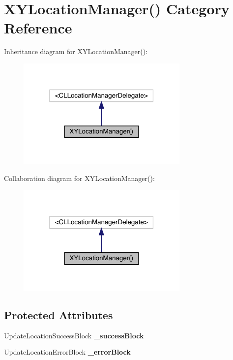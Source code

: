 \hypertarget{category_x_y_location_manager_07_08}{}\section{X\+Y\+Location\+Manager() Category Reference}
\label{category_x_y_location_manager_07_08}


Inheritance diagram for X\+Y\+Location\+Manager()\+:\nopagebreak
\begin{figure}[H]
\begin{center}
\leavevmode
\includegraphics[width=238pt]{category_x_y_location_manager_07_08__inherit__graph}
\end{center}
\end{figure}


Collaboration diagram for X\+Y\+Location\+Manager()\+:\nopagebreak
\begin{figure}[H]
\begin{center}
\leavevmode
\includegraphics[width=238pt]{category_x_y_location_manager_07_08__coll__graph}
\end{center}
\end{figure}
\subsection*{Protected Attributes}
\begin{DoxyCompactItemize}
\item 
\mbox{\label{category_x_y_location_manager_07_08_af0209f7e879e0b4e0c769c49b43384bb}} 
Update\+Location\+Success\+Block {\bfseries \+\_\+success\+Block}
\item 
\mbox{\label{category_x_y_location_manager_07_08_a7f38b5d0bb9d76a040e391acc1089e48}} 
Update\+Location\+Error\+Block {\bfseries \+\_\+error\+Block}
\end{DoxyCompactItemize}
